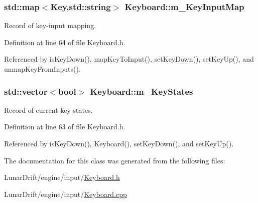 \subsubsection[{\texorpdfstring{m\+\_\+\+Key\+Input\+Map}{m_KeyInputMap}}]{\setlength{\rightskip}{0pt plus 5cm}std\+::map$<${\bf Key},std\+::string$>$ Keyboard\+::m\+\_\+\+Key\+Input\+Map\hspace{0.3cm}{\ttfamily [private]}}\hypertarget{class_keyboard_a9529ce9519c46b47743e643d00ab376b}{}\label{class_keyboard_a9529ce9519c46b47743e643d00ab376b}


Record of key-\/input mapping. 



Definition at line 64 of file Keyboard.\+h.



Referenced by is\+Key\+Down(), map\+Key\+To\+Input(), set\+Key\+Down(), set\+Key\+Up(), and unmap\+Key\+From\+Inputs().

\subsubsection[{\texorpdfstring{m\+\_\+\+Key\+States}{m_KeyStates}}]{\setlength{\rightskip}{0pt plus 5cm}std\+::vector$<$bool$>$ Keyboard\+::m\+\_\+\+Key\+States\hspace{0.3cm}{\ttfamily [private]}}\hypertarget{class_keyboard_ae927c3cd0e8730ab94b8e9538d44c97e}{}\label{class_keyboard_ae927c3cd0e8730ab94b8e9538d44c97e}


Record of current key states. 



Definition at line 63 of file Keyboard.\+h.



Referenced by is\+Key\+Down(), Keyboard(), set\+Key\+Down(), and set\+Key\+Up().



The documentation for this class was generated from the following files\+:\begin{DoxyCompactItemize}
\item 
Lunar\+Drift/engine/input/\hyperlink{_keyboard_8h}{Keyboard.\+h}\item 
Lunar\+Drift/engine/input/\hyperlink{_keyboard_8cpp}{Keyboard.\+cpp}\end{DoxyCompactItemize}
